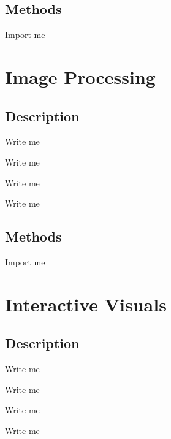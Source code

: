 \documentclass[letterpaper,10pt,english]{sphinxmanual}
\begin{document}
\subsection{Methods}
\label{\detokenize{Sub-Packages:id4}}
\begin{DUlineblock}{0em}
\item[] Import me
\end{DUlineblock}


\section{Image Processing}
\label{\detokenize{Sub-Packages:image-processing}}\label{\detokenize{Sub-Packages:image-processing-module}}

\subsection{Description}
\label{\detokenize{Sub-Packages:id5}}
\begin{DUlineblock}{0em}
\item[] Write me
\item[] Write me
\item[] Write me
\item[] Write me
\end{DUlineblock}


\subsection{Methods}
\label{\detokenize{Sub-Packages:id6}}
\begin{DUlineblock}{0em}
\item[] Import me
\end{DUlineblock}


\section{Interactive Visuals}
\label{\detokenize{Sub-Packages:interactive-visuals}}\label{\detokenize{Sub-Packages:interactive-visuals-module}}

\subsection{Description}
\label{\detokenize{Sub-Packages:id7}}
\begin{DUlineblock}{0em}
\item[] Write me
\item[] Write me
\item[] Write me
\item[] Write me
\end{DUlineblock}
\end{document}
